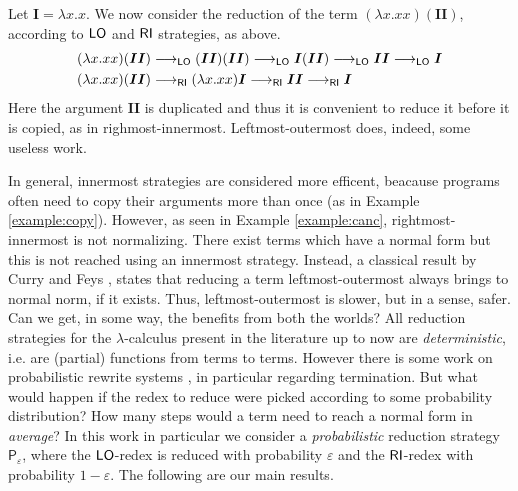\begin{example}\label{example:copy}
	Let $\bm{I}=\lambda x.x$. We now consider the reduction of the term $(\lambda x.xx)(\bm{II})$, according to $\mathsf{LO}$ and $\mathsf{RI}$ strategies, as above.
	\begin{align*}
	(\lambda x.xx)(\bm{II})&\longrightarrow_{\mathsf{LO}} (\bm{II})(\bm{II}) \longrightarrow_{\mathsf{LO}}
	\bm{I}(\bm{II}) \longrightarrow_{\mathsf{LO}} \bm{II} \longrightarrow_{\mathsf{LO}} \bm{I}\\
	(\lambda x.xx)(\bm{II})&\longrightarrow_{\mathsf{RI}} (\lambda x.xx)\bm{I} \longrightarrow_{\mathsf{RI}} \bm{II} \longrightarrow_{\mathsf{RI}} \bm{I}
	\end{align*}
	Here the argument $\bm{II}$ is duplicated and thus it is convenient to reduce it before it is copied, as in righmost-innermost. Leftmost-outermost does, indeed, some useless work.
\end{example}
In general, innermost strategies are considered more efficent, beacause programs often need to copy their arguments more than once (as in Example \ref{example:copy}). However, as seen in Example \ref{example:canc}, rightmost-innermost is not normalizing. There exist terms which have a normal form but this is not reached using an innermost strategy. Instead, a classical result by Curry and Feys \cite{curry_combinatory_1958}, states that reducing a term leftmost-outermost always brings to normal norm, if it exists. Thus, leftmost-outermost is slower, but in a sense, safer. Can we get, in some way, the benefits from both the worlds? 
All reduction strategies for the $\lambda$-calculus present in the literature up to now are \emph{deterministic}, i.e. are (partial) functions from terms to terms. However there is some work on probabilistic rewrite systems \cite{bournez_proving_2005,ferrer_fioriti_probabilistic_2015,avanzini_probabilistic_2018}, in particular regarding termination. But what would happen if the redex to reduce were picked according to some probability distribution? How many steps would a term need to reach a normal form in \emph{average}? In this work in particular we consider a \emph{probabilistic} reduction strategy $\mathsf{P}_\varepsilon$, where the $\mathsf{LO}$-redex is reduced with probability $\varepsilon$ and the $\mathsf{RI}$-redex with probability $1-\varepsilon$. The following are our main results.
